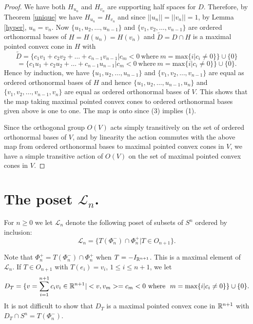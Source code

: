 \documentclass[psamsfonts]{amsart}
\numberwithin{equation}{subsection}
\theoremstyle{plain}
\theoremstyle{definition}
\theoremstyle{remark}
\begin{document}
\begin{proof}
We have both $H_{u_n}$ and $H_{v_n}$ are supporting half spaces  for $D$. Therefore,
by Theorem \ref{unique} we have $H_{u_n} = H_{v_n}$ and since $||u_n|| = ||v_n|| = 1$, by Lemma \ref{hyper}, $u_n = v_n$.  Now $ \{u_1, u_2, \dots , u_{n-1} \}$ and $ \{v_1, v_2, \dots , v_{n-1} \}$ are ordered orthonormal bases of $H = H(u_n) = H(v_n)$ and $\widetilde{D} = D \cap H $ is a maximal pointed convex cone in $H$ with 
$$\widetilde{D} = \{c_1v_1 + c_2v_2 + \dots + c_{n- 1}v_{n-1} | c_m < 0 \ \mbox{where} \ m = \mbox{max}\{i | 
c_i \not= 0 \} \}  \cup \{0\}$$
$$= \{c_1u_1 + c_2u_2 + \dots + c_{n- 1}u_{n-1} | c_m < 0 \ \mbox{where} \ m = \mbox{max}\{i | 
c_i \not= 0 \} \}  \cup \{0\}.$$
Hence by induction, we have $ \{u_1, u_2, \dots , u_{n-1} \}$ and $ \{v_1, v_2, \dots , v_{n-1} \}$ are equal as 
ordered orthonormal bases of $H$  and hence $ \{u_1, u_2, \dots , u_{n-1}, u_n \}$ and\\
 $ \{v_1, v_2, \dots , v_{n-1}, v_n \}$ are equal as 
ordered orthonormal bases of $V$.  This shows that the map taking maximal pointed convex cones to ordered orthonormal bases given above is one to one. The map is onto since (3) implies (1). 

Since the orthogonal group $O(V)$ acts simply transitively on the set of ordered orthonormal bases of $V$, and 
by linearity the action commutes with the above map from ordered orthonormal bases to maximal pointed convex cones in $V$, 
we have a simple transitive action of $O(V)$ on the set of maximal  pointed convex cones in $V$. 
\end{proof}





\section{The poset $\mathcal{L}_n$.}

For $n \geq 0$ we let $\mathcal{L}_n$ denote  the following  poset of subsets of $S^n$ ordered by inclusion:
$$\mathcal{L}_n = \{T(\Phi^-_n) \cap \Phi_n^+ | T\in O_{n + 1} \} .$$

Note that $\Phi_n^+ = T(\Phi^-_n)\cap \Phi_n^+$ when $T = -I_{\Bbb{R}^{n + 1}}$.   This  is a maximal element of $\mathcal{L}_n$. 
If $T \in O_{n + 1}$ with $T(e_i) = v_i$, $1 \leq i \leq n + 1$, we let 
$$D_T = \{ v = \sum_{i = 1}^{n + 1}c_iv_i \in \Bbb{R}^{n + 1} | <v, v_m> = c_m < 0 \ \mbox{where } \  m = \mbox{max}\{i | c_i \not= 0\}\} \cup \{0\}.$$
It is not difficult to show that $D_T $ is a maximal pointed convex cone in $\Bbb{R}^{n + 1}$ with 
$D_T \cap S^{n} =  T(\Phi_n^-)$. 
\end{document}
